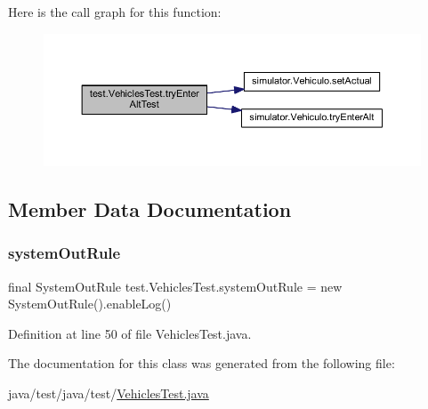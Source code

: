 Here is the call graph for this function\+:\nopagebreak
\begin{figure}[H]
\begin{center}
\leavevmode
\includegraphics[width=350pt]{classtest_1_1_vehicles_test_a7ff46f63103aef8f984b7fbb1f9857fe_cgraph}
\end{center}
\end{figure}


\subsection{Member Data Documentation}
\mbox{\label{classtest_1_1_vehicles_test_aaabf0794cb228d330952cb1392a034b0}} 
\subsubsection{\texorpdfstring{system\+Out\+Rule}{systemOutRule}}
{\footnotesize\ttfamily final System\+Out\+Rule test.\+Vehicles\+Test.\+system\+Out\+Rule = new System\+Out\+Rule().enable\+Log()}



Definition at line 50 of file Vehicles\+Test.\+java.



The documentation for this class was generated from the following file\+:\begin{DoxyCompactItemize}
\item 
java/test/java/test/\mbox{\hyperlink{_vehicles_test_8java}{Vehicles\+Test.\+java}}\end{DoxyCompactItemize}
